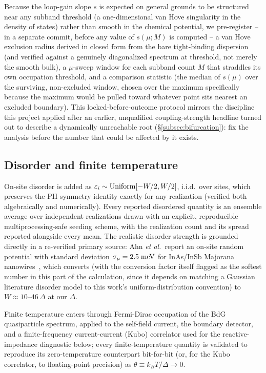 \documentclass[aps,physrev,reprint,superscriptaddress,amsmath,amssymb,floatfix]{revtex4-2}
\begin{document}
Because the loop-gain slope $s$ is expected on general grounds to be
structured near any subband threshold (a one-dimensional van Hove
singularity in the density of states) rather than smooth in the
chemical potential, we pre-register -- in a separate commit, before any
value of $s(\mu;M)$ is computed -- a van Hove exclusion radius derived in
closed form from the bare tight-binding dispersion (and verified against
a genuinely diagonalized spectrum at threshold, not merely the smooth
bulk), a $\mu$-sweep window for each subband count $M$ that straddles its
own occupation threshold, and a comparison statistic (the median of
$s(\mu)$ over the surviving, non-excluded window, chosen over the
maximum specifically because the maximum would be pulled toward whatever
point sits nearest an excluded boundary). This locked-before-outcome
protocol mirrors the discipline this project applied after an earlier,
unqualified coupling-strength headline turned out to describe a
dynamically unreachable root (\S\ref{subsec:bifurcation}): fix the analysis
before the number that could be affected by it exists.

\subsection{Disorder and finite temperature}

On-site disorder is added as $\varepsilon_i\sim{\rm
Uniform}[-W/2,W/2]$, i.i.d.\ over sites, which preserves the PH-symmetry
identity exactly for any realization (verified both algebraically and
numerically). Every reported disordered quantity is an ensemble average
over independent realizations drawn with an explicit, reproducible
multiprocessing-safe seeding scheme, with the realization count and its
spread reported alongside every mean. The realistic disorder strength is
grounded directly in a re-verified primary source: Ahn \emph{et al.}\
report an on-site random potential with standard deviation
$\sigma_\mu=2.5\;{\rm meV}$ for InAs/InSb Majorana
nanowires~\cite{ahn2021}, which converts (with the conversion factor
itself flagged as the softest number in this part of the calculation,
since it depends on matching a Gaussian literature disorder model to this
work's uniform-distribution convention) to $W\approx10$--$46\,\Delta$ at
our $\Delta$.

Finite temperature enters through Fermi-Dirac occupation of the BdG
quasiparticle spectrum, applied to the self-field current, the boundary
detector, and a finite-frequency current-current (Kubo) correlator used
for the reactive-impedance diagnostic below; every finite-temperature
quantity is validated to reproduce its zero-temperature counterpart
bit-for-bit (or, for the Kubo correlator, to floating-point precision) as
$\theta\equiv k_BT/\Delta\to0$.
\end{document}
